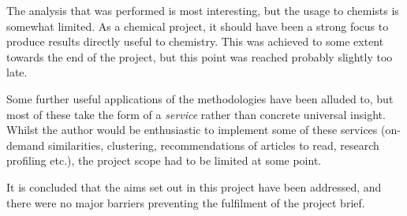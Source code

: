 The analysis that was performed is most interesting, but the usage to chemists is somewhat limited. As a chemical project, it should have been a strong focus to produce results directly useful to chemistry. This was achieved to some extent towards the end of the project, but this point was reached probably slightly too late.

Some further useful applications of the methodologies have been alluded to, but most of these take the form of a \emph{service} rather than concrete universal insight. Whilst the author would be enthusiastic to implement some of these services (on-demand similarities, clustering, recommendations of articles to read, research profiling etc.), the project scope had to be limited at some point.

It is concluded that the aims set out in this project have been addressed, and there were no major barriers preventing the fulfilment of the project brief. 